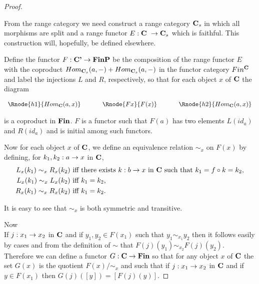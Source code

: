 \begin{proof}
\begin{newt}
From the range category \catcw we need  construct a range category $\textbf{C}_s$ in which all morphisms are split and a range functor $E: \textbf{C}\  \rightarrow \textbf{C}_s$ which is faithful.   
This construction will, hopefully, be defined elsewhere.
\end{newt}

Define the functor $F: \textbf{C'} \rightarrow \textbf{FinP}$ be the
composition of the range functor $E$ with the 
coproduct $Hom_{\textbf{C}_s}(a,-) + Hom_{\textbf{C}_s}(a,-)$
in the functor category $Fin^{\textbf{C}}$ and label the injections $L$ and $R$, respectively,
so that for each object $x$ of $\textbf{C}$ the diagram
\begin{center}
$
\begin{array}{c p{0.5cm} c p{0.5cm} c  }
\Rnode{h1}{Hom_{\catc}(a,x)}  &&\Rnode{Fx}{F(x)}  &&   \Rnode{h2}{Hom_{\catc}(a,x)}       
\end{array} 
$
\end{center}
is a coproduct in $\textbf{Fin}$. $F$ is a functor such that $F(a)$ has two elements
$L(id_a)$ and $R(id_a)$ and is initial among such functors.

Now for each object $x$ of $\textbf{C}$, we define an equivalence relation $\sim_x$ on $F(x)$ by defining,
for $k_1,k_2:a \rightarrow x$ in $\textbf{C}$,
\begin{align*}
L_x(k_1) \sim_x R_x(k_2) & \mbox{ iff there exists $k:b \rightarrow x$ in $\textbf{C}$ such that $k_1 = f \circ k = k_2$,}\\
L_x(k_1) \sim_x L_x(k_2) & \mbox{ iff $k_1 = k_2$,} \\
R_x(k_1) \sim_x R_x(k_2) & \mbox{ iff $k_1 = k_2$.} \\
\end{align*}
\begin{newtt}
It is easy to see that $\sim_x$  is both symmetric and transitive. \\
\end{newtt}
Now \\
If $j: x_1 \rightarrow x_2$ in $\textbf{C}$ and if $y_1,y_2 \in F(x_1)$ such that $y_1 \sim_{x_1} y_2$
then it follows easily by cases and from the definition of $\sim$ that $F(j)(y_1) \sim_{x_2} F(j)(y_2)$.
Therefore we can define a functor 
 $G: \textbf{C} \rightarrow \textbf{Fin}$  so that for any object $x$ of $\textbf{C}$
the set $G(x)$ is the quotient $F(x)/{\sim_x}$ and such that 
if $j: x_1 \rightarrow x_2$ in $\textbf{C}$ and if $y \in F(x_1)$ then $G(j)([y])=[F(j)(y)]$.


\end{proof}
